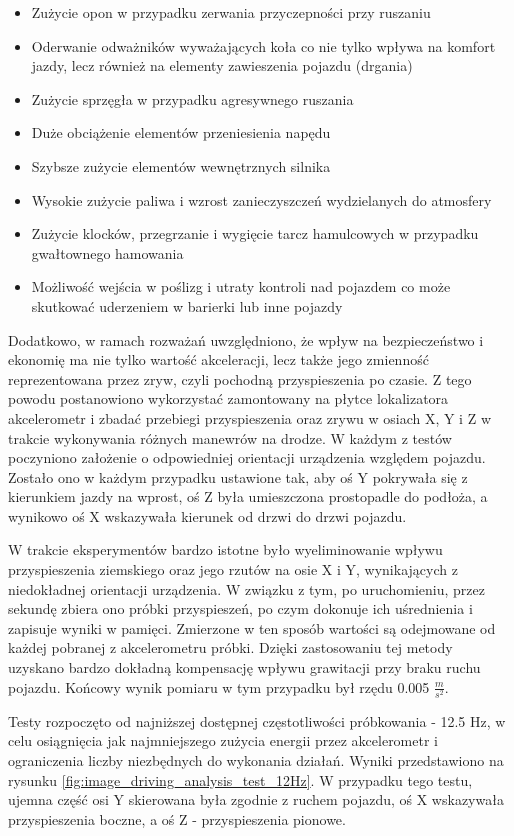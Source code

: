 \begin{itemize}
\item Zużycie opon w przypadku zerwania przyczepności przy ruszaniu
\item Oderwanie odważników wyważających koła co nie tylko wpływa na komfort jazdy, lecz również na elementy zawieszenia pojazdu (drgania)
\item Zużycie sprzęgła w przypadku agresywnego ruszania
\item Duże obciążenie elementów przeniesienia napędu
\item Szybsze zużycie elementów wewnętrznych silnika
\item Wysokie zużycie paliwa i wzrost zanieczyszczeń wydzielanych do atmosfery
\item Zużycie klocków, przegrzanie i wygięcie tarcz hamulcowych w przypadku gwałtownego hamowania
\item Możliwość wejścia w poślizg i utraty kontroli nad pojazdem co może skutkować uderzeniem w barierki lub inne pojazdy
\end{itemize}

Dodatkowo, w ramach rozważań uwzględniono, że wpływ na bezpieczeństwo i ekonomię ma nie tylko wartość akceleracji, lecz także jego zmienność reprezentowana przez zryw, czyli pochodną przyspieszenia po czasie. Z tego powodu postanowiono wykorzystać zamontowany na płytce lokalizatora akcelerometr i zbadać przebiegi przyspieszenia oraz zrywu w osiach X, Y i Z w trakcie wykonywania różnych manewrów na drodze. W każdym z testów poczyniono założenie o odpowiedniej orientacji urządzenia względem pojazdu. Zostało ono w każdym przypadku ustawione tak, aby oś Y pokrywała się z kierunkiem jazdy na wprost, oś Z była umieszczona prostopadle do podłoża, a wynikowo oś X wskazywała kierunek od drzwi do drzwi pojazdu.

W trakcie eksperymentów bardzo istotne było wyeliminowanie wpływu przyspieszenia ziemskiego oraz jego rzutów na osie X i Y, wynikających z niedokładnej orientacji urządzenia. W związku z tym, po uruchomieniu, przez sekundę zbiera ono próbki przyspieszeń, po czym dokonuje ich uśrednienia i zapisuje wyniki w pamięci. Zmierzone w ten sposób wartości są odejmowane od każdej pobranej z akcelerometru próbki. Dzięki zastosowaniu tej metody uzyskano bardzo dokładną kompensację wpływu grawitacji przy braku ruchu pojazdu. Końcowy wynik pomiaru w tym przypadku był rzędu 0.005 $\frac{m}{s^2}$.

Testy rozpoczęto od najniższej dostępnej częstotliwości próbkowania - 12.5 Hz, w celu osiągnięcia jak najmniejszego zużycia energii przez akcelerometr i ograniczenia liczby niezbędnych do wykonania działań. Wyniki przedstawiono na rysunku \ref{fig:image_driving_analysis_test_12Hz}. W przypadku tego testu, ujemna część osi Y skierowana była zgodnie z ruchem pojazdu, oś X wskazywała przyspieszenia boczne, a oś Z - przyspieszenia pionowe.

